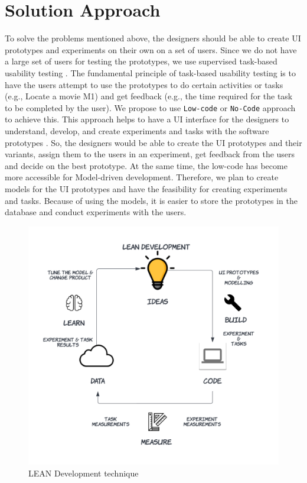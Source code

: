 \section{Solution Approach}
\label{intro:section:solution}
To solve the problems mentioned above, the designers should be able to create UI prototypes and experiments on their own on a set of users.
Since we do not have a large set of users for testing the prototypes, we use supervised task-based usability testing \cite{article:dataanalysis:supervisedtest}.
The fundamental principle of task-based usability testing is to have the users attempt to use the prototypes to do certain activities or tasks (e.g., Locate a movie M1) and get feedback (e.g., the time required for the task to be completed by the user).
We propose to use \texttt{Low-code} or \texttt{No-Code} approach to achieve this.
This approach helps to have a UI interface for the designers to understand, develop, and create experiments and tasks with the software prototypes \cite{paper:lowcode:khorram}.
So, the designers would be able to create the UI prototypes and their variants, assign them to the users in an experiment, get feedback from the users and decide on the best prototype.
At the same time, the low-code has become more accessible for Model-driven development.
Therefore, we plan to create models for the UI prototypes and have the feasibility for creating experiments and tasks. 
Because of using the models, it is easier to store the prototypes in the database and conduct experiments with the users. 

\begin{figure}[ht]
    \centering
    \includegraphics[scale=0.15]{images/solution-ideas/LEAN.png}
    \caption{LEAN Development technique}
    \label{intro:fig:lean}
\end{figure}

